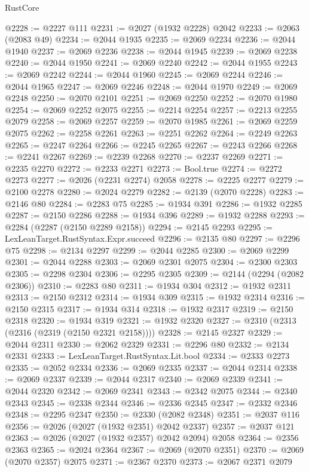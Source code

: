 \begin{lexlean}{RustCore}
\begin{coremodule}
@2228 := @2227 @111
@2231 := @2027 (@1932 @2228) @2042
@2233 := @2063 (@2083 @49)
@2234 := @2044 @1935
@2235 := @2069 @2234
@2236 := @2044 @1940
@2237 := @2069 @2236
@2238 := @2044 @1945
@2239 := @2069 @2238
@2240 := @2044 @1950
@2241 := @2069 @2240
@2242 := @2044 @1955
@2243 := @2069 @2242
@2244 := @2044 @1960
@2245 := @2069 @2244
@2246 := @2044 @1965
@2247 := @2069 @2246
@2248 := @2044 @1970
@2249 := @2069 @2248
@2250 := @2070 @2101
@2251 := @2069 @2250
@2252 := @2070 @1980
@2254 := @2069 @2252 @2075
@2255 := @2214 @2254
@2257 := @2213 @2255 @2079
@2258 := @2069 @2257
@2259 := @2070 @1985
@2261 := @2069 @2259 @2075
@2262 := @2258 @2261
@2263 := @2251 @2262
@2264 := @2249 @2263
@2265 := @2247 @2264
@2266 := @2245 @2265
@2267 := @2243 @2266
@2268 := @2241 @2267
@2269 := @2239 @2268
@2270 := @2237 @2269
@2271 := @2235 @2270
@2272 := @2233 @2271
@2273 := Bool.true
@2274 := @2272 @2273
@2277 := @2026 (@2231 @2274) @2058
@2278 := @2225 @2277
@2279 := @2100 @2278
@2280 := @2024 @2279
@2282 := @2139 (@2070 @2228)
@2283 := @2146 @80
@2284 := @2283 @75
@2285 := @1934 @391
@2286 := @1932 @2285
@2287 := @2150 @2286
@2288 := @1934 @396
@2289 := @1932 @2288
@2293 := @2284 (@2287 (@2150 @2289 @2158))
@2294 := @2145 @2293
@2295 := LexLeanTarget.RustSyntax.Expr.succeed
@2296 := @2135 @80
@2297 := @2296 @75
@2298 := @2134 @2297
@2299 := @2044 @2285
@2300 := @2069 @2299
@2301 := @2044 @2288
@2303 := @2069 @2301 @2075
@2304 := @2300 @2303
@2305 := @2298 @2304
@2306 := @2295 @2305
@2309 := @2144 (@2294 (@2082 @2306))
@2310 := @2283 @80
@2311 := @1934 @304
@2312 := @1932 @2311
@2313 := @2150 @2312
@2314 := @1934 @309
@2315 := @1932 @2314
@2316 := @2150 @2315
@2317 := @1934 @314
@2318 := @1932 @2317
@2319 := @2150 @2318
@2320 := @1934 @319
@2321 := @1932 @2320
@2327 := @2310 (@2313 (@2316 (@2319 (@2150 @2321 @2158))))
@2328 := @2145 @2327
@2329 := @2044 @2311
@2330 := @2062 @2329
@2331 := @2296 @80
@2332 := @2134 @2331
@2333 := LexLeanTarget.RustSyntax.Lit.bool
@2334 := @2333 @2273
@2335 := @2052 @2334
@2336 := @2069 @2335
@2337 := @2044 @2314
@2338 := @2069 @2337
@2339 := @2044 @2317
@2340 := @2069 @2339
@2341 := @2044 @2320
@2342 := @2069 @2341
@2343 := @2342 @2075
@2344 := @2340 @2343
@2345 := @2338 @2344
@2346 := @2336 @2345
@2347 := @2332 @2346
@2348 := @2295 @2347
@2350 := @2330 (@2082 @2348)
@2351 := @2037 @116
@2356 := @2026 (@2027 (@1932 @2351) @2042 @2337)
@2357 := @2037 @121
@2363 := @2026 (@2027 (@1932 @2357) @2042 @2094) @2058
@2364 := @2356 @2363
@2365 := @2024 @2364
@2367 := @2069 (@2070 @2351)
@2370 := @2069 (@2070 @2357) @2075
@2371 := @2367 @2370
@2373 := @2067 @2371 @2079

\end{coremodule}
\end{lexlean}
